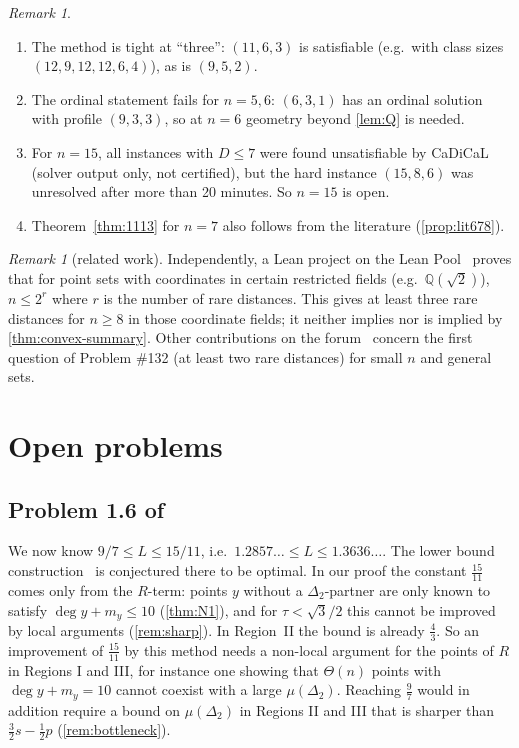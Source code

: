 \documentclass[11pt]{amsart}
\theoremstyle{definition}
\theoremstyle{remark}
\newtheorem{remark}[theorem]{Remark}
\newcommand{\Dt}{\Delta_2}
\newcommand{\mult}{\mu}
\begin{document}
\begin{remark}\label{rem:ordinal}
\begin{enumerate}[leftmargin=2em,label=(\alph*)]
\item The method is tight at ``three'': $(11,6,3)$ is satisfiable (e.g.\ with class sizes $(12,9,12,12,6,4)$), as is $(9,5,2)$.
\item The ordinal statement fails for $n=5,6$: $(6,3,1)$ has an ordinal solution with profile $(9,3,3)$, so at $n=6$ geometry beyond \cref{lem:Q} is needed.
\item For $n=15$, all instances with $D\le7$ were found unsatisfiable by CaDiCaL (solver output only, not certified), but the hard instance $(15,8,6)$ was unresolved after more than 20 minutes. So $n=15$ is open.
\item Theorem~\ref{thm:1113} for $n=7$ also follows from the literature (\cref{prop:lit678}).
\end{enumerate}
\end{remark}

\begin{remark}[related work]
Independently, a Lean project on the Lean Pool~\cite{lyfar} proves that for point sets with coordinates in certain restricted fields (e.g.\ $\mathbb Q(\sqrt2)$), $n\le2^r$ where $r$ is the number of rare distances. This gives at least three rare distances for $n\ge8$ in those coordinate fields; it neither implies nor is implied by \cref{thm:convex-summary}. Other contributions on the forum~\cite{forum132} concern the first question of Problem \#132 (at least two rare distances) for small $n$ and general sets.
\end{remark}

\section{Open problems}\label{sec:open}

\subsection*{\texorpdfstring{Problem 1.6 of~\cite{CDL25}}{Problem 1.6 of CDL}}
We now know $9/7\le L\le15/11$, i.e.\ $1.2857\ldots\le L\le1.3636\ldots$. The lower bound construction~\cite{ienjoymath} is conjectured there to be optimal. In our proof the constant $\frac{15}{11}$ comes only from the $R$-term: points $y$ without a $\Dt$-partner are only known to satisfy $\deg y+m_y\le10$ (\cref{thm:N1}), and for $\tau<\sqrt3/2$ this cannot be improved by local arguments (\cref{rem:sharp}). In Region~II the bound is already $\frac43$. So an improvement of $\frac{15}{11}$ by this method needs a non-local argument for the points of $R$ in Regions I and III, for instance one showing that $\Theta(n)$ points with $\deg y+m_y=10$ cannot coexist with a large $\mult(\Dt)$. Reaching $\frac97$ would in addition require a bound on $\mult(\Dt)$ in Regions II and III that is sharper than $\frac32s-\frac12p$ (\cref{rem:bottleneck}).
\end{document}

